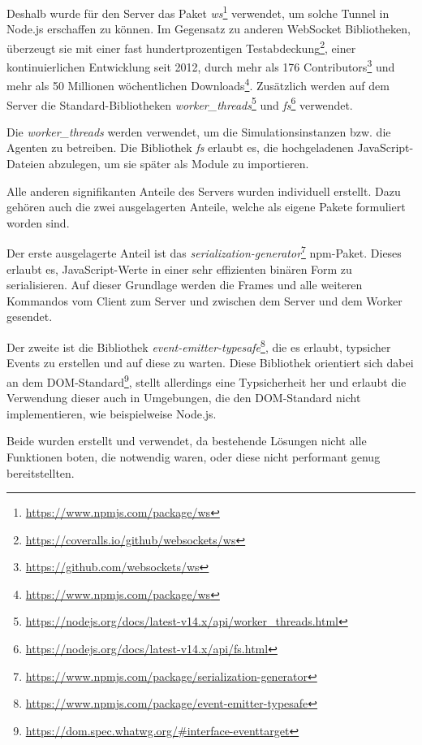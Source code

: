 Deshalb wurde für den Server das Paket \textit{ws}\footnote{\url{https://www.npmjs.com/package/ws}} verwendet, um solche Tunnel in Node.js erschaffen zu können.
Im Gegensatz zu anderen WebSocket Bibliotheken, überzeugt sie mit einer fast hundertprozentigen Testabdeckung\footnote{\url{https://coveralls.io/github/websockets/ws}}, einer kontinuierlichen Entwicklung seit 2012, durch mehr als 176 Contributors\footnote{\url{https://github.com/websockets/ws}} und mehr als 50 Millionen wöchentlichen Downloads\footnote{\url{https://www.npmjs.com/package/ws}}.
Zusätzlich werden auf dem Server die Standard-Bibliotheken \textit{worker\_threads}\footnote{\url{https://nodejs.org/docs/latest-v14.x/api/worker_threads.html}} und \textit{fs}\footnote{\url{https://nodejs.org/docs/latest-v14.x/api/fs.html}} verwendet.

Die \textit{worker\_threads} werden verwendet, um die Simulationsinstanzen bzw. die Agenten zu betreiben.
Die Bibliothek \textit{fs} erlaubt es, die hochgeladenen JavaScript-Dateien abzulegen, um sie später als Module zu importieren.

Alle anderen signifikanten Anteile des Servers wurden individuell erstellt.
Dazu gehören auch die zwei ausgelagerten Anteile, welche als eigene Pakete formuliert worden sind.

Der erste ausgelagerte Anteil ist das \textit{serialization-generator}\footnote{\url{https://www.npmjs.com/package/serialization-generator}} npm-Paket.
Dieses erlaubt es, JavaScript-Werte in einer sehr effizienten binären Form zu serialisieren.
Auf dieser Grundlage werden die Frames und alle weiteren Kommandos vom Client zum Server und zwischen dem Server und dem Worker gesendet.

Der zweite ist die Bibliothek \textit{event-emitter-typesafe}\footnote{\url{https://www.npmjs.com/package/event-emitter-typesafe}}, die es erlaubt, typsicher Events zu erstellen und auf diese zu warten.
Diese Bibliothek orientiert sich dabei an dem DOM-Standard\footnote{\url{https://dom.spec.whatwg.org/\#interface-eventtarget}}, stellt allerdings eine Typsicherheit her und erlaubt die Verwendung dieser auch in Umgebungen, die den DOM-Standard nicht implementieren, wie beispielweise Node.js.

Beide wurden erstellt und verwendet, da bestehende Lösungen nicht alle Funktionen boten, die notwendig waren, oder diese nicht performant genug bereitstellten.


